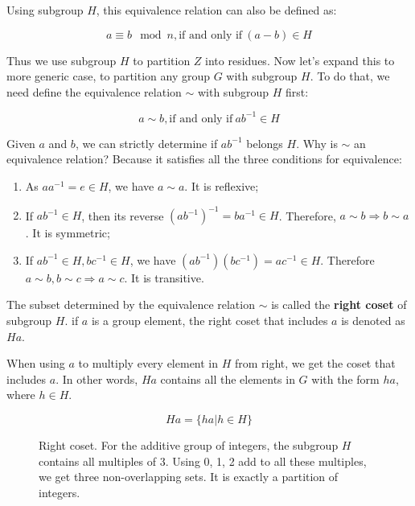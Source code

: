 \documentclass{article}
\begin{document}
Using subgroup $H$, this equivalence relation can also be defined as:

\[
a \equiv b \mod n, \text{if and only if}\ (a - b) \in H
\]

Thus we use subgroup $H$ to partition $Z$ into residues. Now let's expand this to more generic case, to partition any group $G$ with subgroup $H$. To do that, we need define the equivalence relation $\sim$ with subgroup $H$ first:

\[
a \sim b, \text{if and only if}\ ab^{-1} \in H
\]

Given $a$ and $b$, we can strictly determine if $ab^{-1}$ belongs $H$. Why is $\sim$ an equivalence relation? Because it satisfies all the three conditions for equivalence:

\begin{enumerate}
\item As $aa^{-1} = e \in H$, we have $a \sim a$. It is reflexive;
\item If $ab^{-1} \in H$, then its reverse $(ab^{-1})^{-1}= ba^{-1} \in H$. Therefore, $a \sim b \Rightarrow b \sim a$. It is symmetric;
\item If $ab^{-1} \in H, bc^{-1} \in H$, we have $(ab^{-1})(bc^{-1}) = ac^{-1} \in H$. Therefore $a \sim b, b \sim c \Rightarrow a \sim c$. It is transitive.
\end{enumerate}

\begin{definition}
The subset determined by the equivalence relation $\sim$ is called the \textbf{right coset} of subgroup $H$. if $a$ is a group element, the right coset that includes $a$ is denoted as $Ha$.
\end{definition}

When using $a$ to multiply every element in $H$ from right, we get the coset that includes $a$. In other words, $Ha$ contains all the elements in $G$ with the form $ha$, where $h \in H$.

\[
Ha = \{ha | h \in H\}
\]

\begin{figure}[htbp]
\centering
{}
\caption{Right coset. For the additive group of integers, the subgroup $H$ contains all multiples of 3. Using 0, 1, 2 add to all these multiples, we get three non-overlapping sets. It is exactly a partition of integers.}
\label{fig:right-cosets-Z3}
\end{figure}
\end{document}
